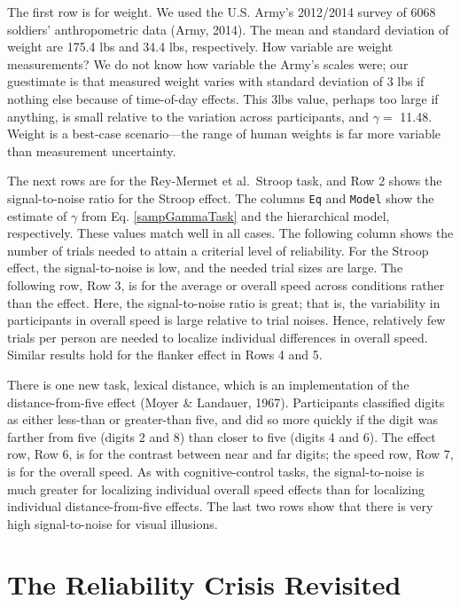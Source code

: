 \documentclass[
  ,man]{apa6}
\begin{document}
The first row is for weight. We used the U.S. Army's 2012/2014 survey of 6068 soldiers' anthropometric data (Army, 2014). The mean and standard deviation of weight are 175.4 lbs and 34.4 lbs, respectively. How variable are weight measurements? We do not know how variable the Army's scales were; our guestimate is that measured weight varies with standard deviation of 3 lbs if nothing else because of time-of-day effects. This 3lbs value, perhaps too large if anything, is small relative to the variation across participants, and \(\gamma =\) 11.48. Weight is a best-case scenario---the range of human weights is far more variable than measurement uncertainty.

The next rows are for the Rey-Mermet et al.~Stroop task, and Row 2 shows the signal-to-noise ratio for the Stroop effect. The columns \texttt{Eq} and \texttt{Model} show the estimate of \(\gamma\) from Eq. \ref{sampGammaTask} and the hierarchical model, respectively. These values match well in all cases. The following column shows the number of trials needed to attain a criterial level of reliability. For the Stroop effect, the signal-to-noise is low, and the needed trial sizes are large. The following row, Row 3, is for the average or overall speed across conditions rather than the effect. Here, the signal-to-noise ratio is great; that is, the variability in participants in overall speed is large relative to trial noises. Hence, relatively few trials per person are needed to localize individual differences in overall speed. Similar results hold for the flanker effect in Rows 4 and 5.

There is one new task, lexical distance, which is an implementation of the distance-from-five effect (Moyer \& Landauer, 1967). Participants classified digits as either less-than or greater-than five, and did so more quickly if the digit was farther from five (digits 2 and 8) than closer to five (digits 4 and 6). The effect row, Row 6, is for the contrast between near and far digits; the speed row, Row 7, is for the overall speed. As with cognitive-control tasks, the signal-to-noise is much greater for localizing individual overall speed effects than for localizing individual distance-from-five effects. The last two rows show that there is very high signal-to-noise for visual illusions.

\hypertarget{the-reliability-crisis-revisited}{%
\section{The Reliability Crisis Revisited}\label{the-reliability-crisis-revisited}}
\end{document}
